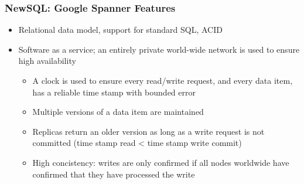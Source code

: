 \subsubsection{NewSQL: Google Spanner Features}

\begin{itemize}
    \item Relational data model, support for standard SQL, ACID
    \item Software as a service; an entirely private world-wide network is used to ensure high availability
    \begin{itemize}
        \item A clock is used to ensure every read/write request, and every data item, has a reliable time stamp with bounded error
        \item Multiple versions of a data item are maintained
        \item Replicas return an older version as long as a write request is not committed (time stamp read < time stamp write commit)
        \item High concistency: writes are only confirmed if all nodes worldwide have confirmed that they have processed the write
    \end{itemize}
\end{itemize}
